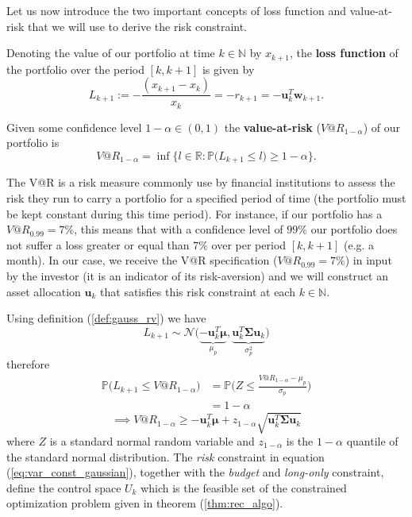 Let us now introduce the two important concepts of loss function and value-at-risk that we will use to derive the risk constraint.
\begin{definition}\label{def:loss_function}
	Denoting the value of our portfolio at time $k \in \mathbb{N}$ by $x_{k+1}$, the \textbf{loss function} of the portfolio over the period $[k,k+1]$ is given by \[ L_{k+1}:= -\frac{(x_{k+1}-x_k)}{x_k}= -r_{k+1} = -\bm{u}_k^T \bm{w}_{k+1}.  \]
\end{definition}
\begin{definition}
	Given some confidence level $1-\alpha \in (0,1) $ the \textbf{value-at-risk} ($V@R_{1-\alpha}$) of our portfolio is \[ V@R_{1-\alpha} = \inf\{l\in \mathbb{R} : \mathbb{P}\big(L_{k+1} \leq l \big) \geq 1-\alpha \}. \]
\end{definition}
	

The V@R is a risk measure commonly use by financial institutions to assess the risk they run to carry a portfolio for a specified period of time (the portfolio must be kept constant during this time period). For instance, if our portfolio has a $V@R_{0.99} = 7\%$, this means that with a confidence level of $99\%$ our portfolio does not suffer a loss greater or equal than $7\%$ over per period $[k,k+1]$ (e.g. a month). In our case, we receive the V@R specification ($V@R_{0.99} = 7\%$) in input by the investor (it is an indicator of its risk-aversion) and we will construct an asset allocation $\bm{u}_k$ that satisfies this risk constraint at each $k \in \mathbb{N}$.

Using definition (\ref{def:gauss_rv}) we have \[ L_{k+1} \sim \mathcal{N}\big(\underbrace{-\bm{u}_k^T \bm{\mu}}_{\mu_p},\underbrace{\bm{u}_k^T \bm{\Sigma} \bm{u}_k}_{\sigma^2_p} \big)\] therefore
\begin{align*}
\mathbb{P}\big(L_{k+1} \leq V@R_{1-\alpha}\big) 
& = \mathbb{P}\Big(Z \leq \frac{V@R_{1-\alpha} - \mu_p}{\sigma_p}  \Big) \\
& = 1 - \alpha
\end{align*}
\begin{equation}\label{eq:var_const_gaussian}
\implies \boxed{V@R_{1-\alpha} \geq -\bm{u}_k^T\bm{\mu} + z_{1-\alpha} \sqrt{\bm{u}_k^T \bm{\Sigma} \bm{u}_k}}
\end{equation}
where $Z$ is a standard normal random variable and $z_{1-\alpha}$ is the $1-\alpha$ quantile of the standard normal distribution. The \textit{risk} constraint in equation (\ref{eq:var_const_gaussian}), together with the \textit{budget} and \textit{long-only} constraint, define the control space $U_k$ which is the feasible set of the constrained optimization problem given in theorem (\ref{thm:rec_algo}).
